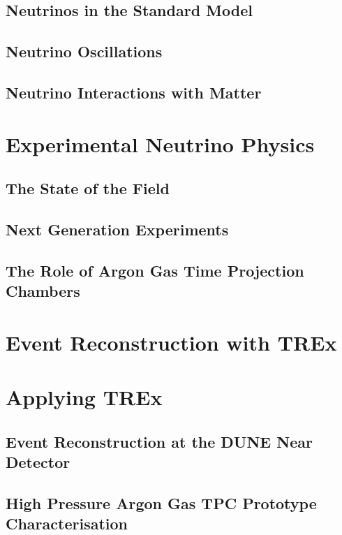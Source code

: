 \documentclass[a4paper, 11pt]{report}
\begin{document}
\section{Neutrinos in the Standard Model}


\section{Neutrino Oscillations}


\section{Neutrino Interactions with Matter}


\chapter{Experimental Neutrino Physics}
\section{The State of the Field}


\section{Next Generation Experiments}


\section{The Role of Argon Gas Time Projection Chambers}


\chapter{Event Reconstruction with TREx}



\chapter{Applying TREx}
\section{Event Reconstruction at the DUNE Near Detector}


\section{High Pressure Argon Gas TPC Prototype Characterisation}

\end{document}
